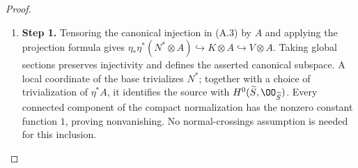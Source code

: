 \begin{proof}
\begin{enumerate}[label={$\langle1\rangle$\arabic*.},leftmargin=*]
\item 
\noindent\textbf{Step 1.} Tensoring the canonical injection in (A.3) by $A$ and applying the projection formula gives
$\eta_*\eta^*(N^*\otimes A)\hookrightarrow K\otimes A\hookrightarrow V\otimes A$.
Taking global sections preserves injectivity and defines the asserted canonical subspace. A local coordinate of the base trivializes $N^*$; together with a choice of trivialization of $\eta^*A$, it identifies the source with $H^0(\widetilde S,\OO_{\widetilde S})$. Every connected component of the compact normalization has the nonzero constant function $1$, proving nonvanishing. No normal-crossings assumption is needed for this inclusion.

\end{enumerate}
\end{proof}
